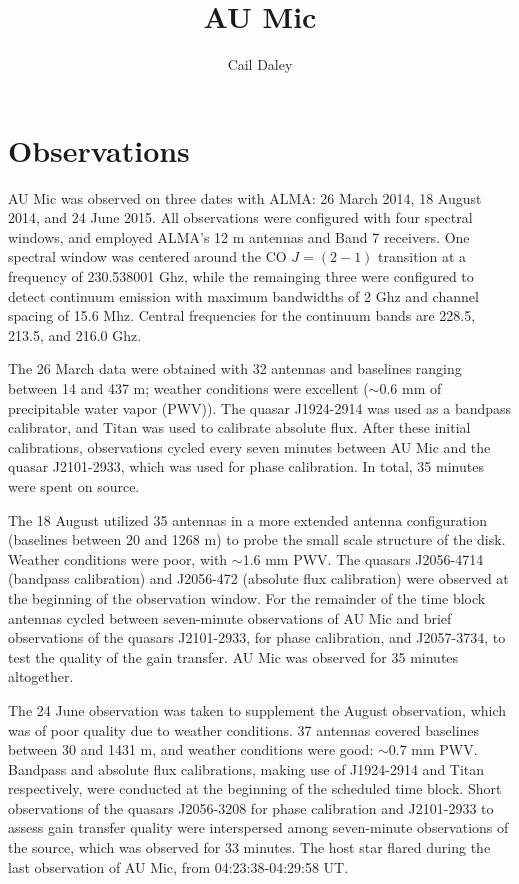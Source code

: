 \documentclass[12pt,modern,oneside]{book}
\begin{document}
\title{AU Mic}

\author{Cail Daley}


\section{Observations}

AU Mic was observed on three dates with ALMA: 26 March 2014, 18 August 2014, and
24 June 2015. All observations were configured with four spectral windows, and
employed ALMA's 12 m antennas and Band 7 receivers. One spectral window was
centered around the CO $J = (2-1)$ transition at a frequency of 230.538001 Ghz,
while the remainging three were configured to detect continuum emission with
maximum bandwidths of 2 Ghz and channel spacing of 15.6 Mhz. Central frequencies
for the continuum bands are 228.5, 213.5, and 216.0 Ghz.

The 26 March data were obtained with 32 antennas and baselines ranging between
14 and 437 m; weather conditions were excellent ($\sim$0.6 mm of precipitable
water vapor (PWV)). The quasar J1924-2914 was used as a bandpass calibrator, and Titan
was used to calibrate absolute flux. After these initial calibrations,
observations cycled every seven minutes between AU Mic and the quasar
J2101-2933, which was used for phase calibration. In total, 35 minutes were
spent on source.

The 18 August utilized 35 antennas in a more extended antenna configuration
(baselines between 20 and 1268 m) to probe the small scale structure of the
disk. Weather conditions were poor, with $\sim$1.6 mm PWV. The quasars J2056-4714 (bandpass calibration) and J2056-472 (absolute
flux calibration) were observed at the beginning of the observation window. For
the remainder of the time block antennas cycled between seven-minute
observations of AU Mic and brief observations of the quasars J2101-2933, for
phase calibration, and J2057-3734, to test the quality of the gain transfer. AU
Mic was observed for 35 minutes altogether.

The 24 June observation was taken to supplement the August observation, which was of
poor quality due to weather conditions. 37 antennas covered baselines between 30 and
1431 m, and weather conditions were good: $\sim$0.7 mm PWV. Bandpass and absolute flux calibrations, making use of J1924-2914 and
Titan respectively, were conducted at the beginning of the scheduled time block.
Short observations of the quasars J2056-3208 for phase calibration and
J2101-2933 to assess gain transfer quality were interspersed among
seven-minute observations of the source, which was observed for 33 minutes. The
host star flared during the last observation of AU Mic, from 04:23:38-04:29:58
UT.
\end{document}
